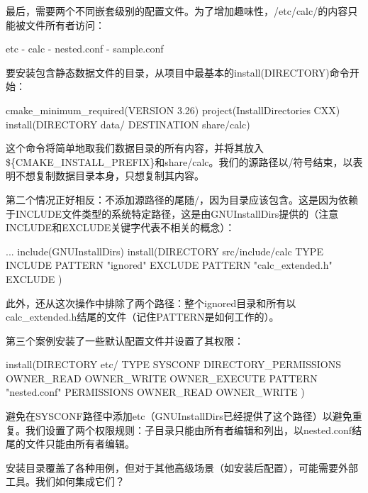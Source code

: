 最后，需要两个不同嵌套级别的配置文件。为了增加趣味性，/etc/calc/的内容只能被文件所有者访问：

\begin{shell}
etc
- calc
  - nested.conf
- sample.conf
\end{shell}

要安装包含静态数据文件的目录，从项目中最基本的install(DIRECTORY)命令开始：


\begin{cmake}
cmake_minimum_required(VERSION 3.26)
project(InstallDirectories CXX)
install(DIRECTORY data/ DESTINATION share/calc)
\end{cmake}

这个命令将简单地取我们数据目录的所有内容，并将其放入\$\{CMAKE\_INSTALL\_PREFIX\}和share/calc。我们的源路径以/符号结束，以表明不想复制数据目录本身，只想复制其内容。

第二个情况正好相反：不添加源路径的尾随/，因为目录应该包含。这是因为依赖于INCLUDE文件类型的系统特定路径，这是由GNUInstallDirs提供的（注意INCLUDE和EXCLUDE关键字代表不相关的概念）：


\begin{cmake}
...
include(GNUInstallDirs)
install(DIRECTORY src/include/calc TYPE INCLUDE
    PATTERN "ignored" EXCLUDE
    PATTERN "calc_extended.h" EXCLUDE
)
\end{cmake}

此外，还从这次操作中排除了两个路径：整个ignored目录和所有以calc\_extended.h结尾的文件（记住PATTERN是如何工作的）。

第三个案例安装了一些默认配置文件并设置了其权限：


\begin{cmake}
install(DIRECTORY etc/ TYPE SYSCONF
    DIRECTORY_PERMISSIONS
        OWNER_READ OWNER_WRITE OWNER_EXECUTE
    PATTERN "nested.conf"
        PERMISSIONS OWNER_READ OWNER_WRITE
)
\end{cmake}

避免在SYSCONF路径中添加etc（GNUInstallDirs已经提供了这个路径）以避免重复。我们设置了两个权限规则：子目录只能由所有者编辑和列出，以nested.conf结尾的文件只能由所有者编辑。

安装目录覆盖了各种用例，但对于其他高级场景（如安装后配置），可能需要外部工具。我们如何集成它们？

